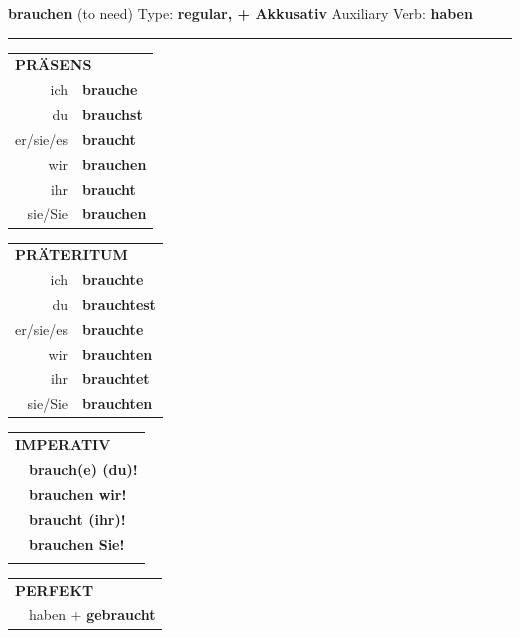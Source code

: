 \documentclass[10pt,a4paper]{revtex4-2}
\begin{document}
\begin{verbbox-acc}
    {\Large \bf brauchen} (to need) \hfill Type: \textbf{regular, + Akkusativ} \hfill Auxiliary Verb: \textbf{haben} 
    
     \vspace{5pt}

    \hrule
    
    \vspace{5pt}

  \begin{tabular}{rl}
     \multicolumn{2}{l}{\textbf{PRÄSENS} }\\
    ich & \textbf{brauche}\\
    du & \textbf{brauchst}\\
    er/sie/es & \textbf{braucht}\\
    wir & \textbf{brauchen}\\
    ihr & \textbf{braucht}\\
    sie/Sie & \textbf{brauchen}\\
  \end{tabular}
  \hfill
     \begin{tabular}{rl}
    \multicolumn{2}{l}{\textbf{PRÄTERITUM} }\\
    ich & \textbf{brauchte}\\
    du & \textbf{brauchtest}\\
    er/sie/es & \textbf{brauchte}\\
    wir & \textbf{brauchten}\\
    ihr & \textbf{brauchtet}\\
    sie/Sie & \textbf{brauchten}\\
  \end{tabular}
  \hfill
  \begin{tabular}{rl}
     \multicolumn{2}{l}{\textbf{IMPERATIV} }\\
   & \textbf{brauch(e) (du)!}\\
   & \textbf{brauchen wir!}\\
   & \textbf{braucht (ihr)!}\\
   & \textbf{brauchen Sie!}\\
   & \vspace{10pt}
  \end{tabular}

    \vspace{10pt}

 \begin{tabular}{rl}
     \multicolumn{2}{l}{\textbf{PERFEKT}}\\
   & haben + \textbf{gebraucht}\\
  \end{tabular}
\hfill
   \begin{tabular}{rl}
   

\end{tabular}
\end{verbbox-acc}
\end{document}
